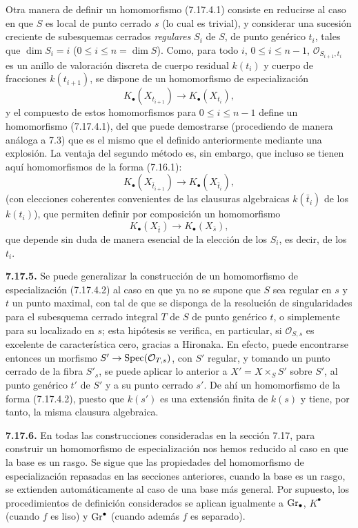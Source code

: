 Otra manera de definir un homomorfismo (7.17.4.1) consiste en reducirse al caso en que \(S\) es local de punto cerrado \(s\) (lo cual es trivial), y considerar una sucesión creciente de subesquemas cerrados \emph{regulares} \(S_i\) de \(S\), de punto genérico \(t_i\), tales que \(\dim S_i=i\) (\(0\leq i\leq n=\dim S\)). Como, para todo \(i\), \(0\leq i\leq n-1\), \(\mathcal O_{S_{i+1},t_i}\) es un anillo de valoración discreta de cuerpo residual \(k(t_i)\) y cuerpo de fracciones \(k(t_{i+1})\), se dispone de un homomorfismo de especialización
\[
  K_\bullet(X_{t_{i+1}})\longrightarrow K_\bullet(X_{t_i}),
\]
y el compuesto de estos homomorfismos para \(0\leq i\leq n-1\) define un homomorfismo (7.17.4.1), del que puede demostrarse (procediendo de manera análoga a 7.3) que es el mismo que el definido anteriormente mediante una explosión. La ventaja del segundo método es, sin embargo, que incluso se tienen aquí homomorfismos de la forma (7.16.1):
\[
  K_\bullet(X_{\bar t_{i+1}})\longrightarrow K_\bullet(X_{\bar t_i}),
\]
(con elecciones coherentes convenientes de las clausuras algebraicas \(k(\bar t_i)\) de los \(k(t_i)\)), que permiten definir por composición un homomorfismo
\begin{equation}\tag{7.17.4.2}
  K_\bullet(X_{\bar t})\longrightarrow K_\bullet(X_{\bar s}),
\end{equation}
que depende sin duda de manera esencial de la elección de los \(S_i\), es decir, de los \(t_i\).

\textbf{7.17.5.} Se puede generalizar la construcción de un homomorfismo de especialización (7.17.4.2) al caso en que ya no se supone que \(S\) sea regular en \(s\) y \(t\) un punto maximal, con tal de que se disponga de la resolución de singularidades para el subesquema cerrado integral \(T\) de \(S\) de punto genérico \(t\), o simplemente para su localizado en \(s\); esta hipótesis se verifica, en particular, si \(\mathcal O_{S,s}\) es excelente de característica cero, gracias a Hironaka. En efecto, puede encontrarse entonces un morfismo \(S'\to \operatorname{Spec}(\mathcal O_{T,s})\), con \(S'\) regular, y tomando un punto cerrado de la fibra \(S'_s\), se puede aplicar lo anterior a \(X'=X\times_S S'\) sobre \(S'\), al punto genérico \(t'\) de \(S'\) y a su punto cerrado \(s'\). De ahí un homomorfismo de la forma (7.17.4.2), puesto que \(k(s')\) es una extensión finita de \(k(s)\) y tiene, por tanto, la misma clausura algebraica.

\textbf{7.17.6.} En todas las construcciones consideradas en la sección 7.17, para construir un homomorfismo de especialización nos hemos reducido al caso en que la base es un rasgo. Se sigue que las propiedades del homomorfismo de especialización repasadas en las secciones anteriores, cuando la base es un rasgo, se extienden automáticamente al caso de una base más general. Por supuesto, los procedimientos de definición considerados se aplican igualmente a \(\operatorname{Gr}_\bullet\), \(K^\bullet\) (cuando \(f\) es liso) y \(\operatorname{Gr}^\bullet\) (cuando además \(f\) es separado).

